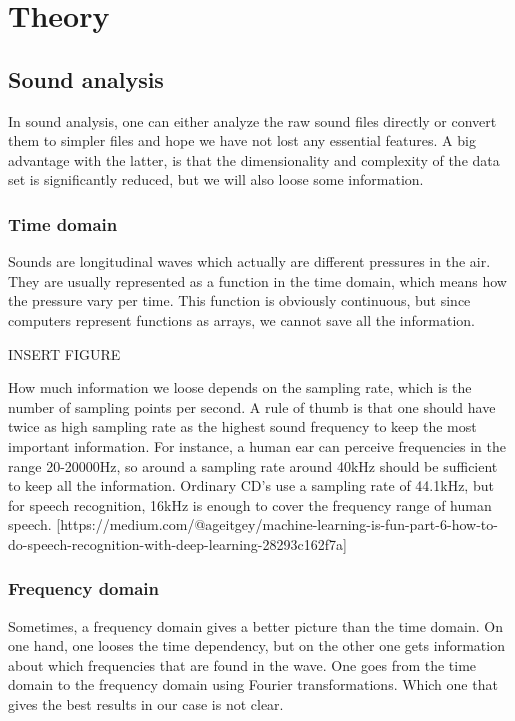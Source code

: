 \section{Theory} \label{sec:theory}

\subsection{Sound analysis}
In sound analysis, one can either analyze the raw sound files directly or convert them to simpler files and hope we have not lost any essential features. A big advantage with the latter, is that the dimensionality and complexity of the data set is significantly reduced, but we will also loose some information. 

\subsubsection{Time domain}
Sounds are longitudinal waves which actually are different pressures in the air. They are usually represented as a function in the time domain, which means how the pressure vary per time. This function is obviously continuous, but since computers represent functions as arrays, we cannot save all the information. 

INSERT FIGURE

How much information we loose depends on the sampling rate, which is the number of sampling points per second. A rule of thumb is that one should have twice as high sampling rate as the highest sound frequency to keep the most important information. For instance, a human ear can perceive frequencies in the range 20-20000Hz, so around a sampling rate around 40kHz should be sufficient to keep all the information. Ordinary CD's use a sampling rate of 44.1kHz, but for speech recognition, 16kHz is enough to cover the frequency range of human speech. [https://medium.com/@ageitgey/machine-learning-is-fun-part-6-how-to-do-speech-recognition-with-deep-learning-28293c162f7a] 

\subsubsection{Frequency domain}
Sometimes, a frequency domain gives a better picture than the time domain. On one hand, one looses the time dependency, but on the other one gets information about which frequencies that are found in the wave. One goes from the time domain to the frequency domain using Fourier transformations. Which one that gives the best results in our case is not clear. 

